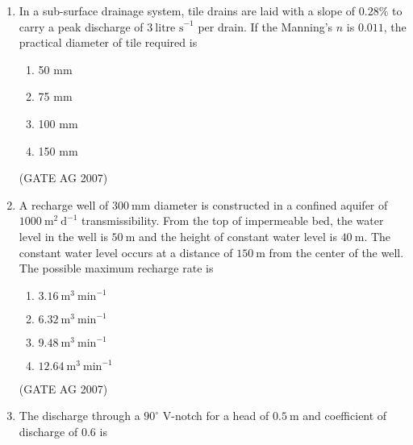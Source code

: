 \documentclass[journal,12pt,onecolumn]{IEEEtran}
\theoremstyle{remark}
\begin{document}
\begin{enumerate}[label=Q\arabic*:]
\begin{multicols}{4}
\begin{enumerate}
\item 21110 m$^3$
\item 32220 m$^3$
\item 42220 m$^3$
\item 59340 m$^3$
\end{enumerate}
\end{multicols}
\hfill(GATE AG 2007)

\item In a sub-surface drainage system, tile drains are laid with a slope of $0.28\%$ to carry a peak discharge of $3\ \text{litre s}^{-1}$ per drain. If the Manning's $n$ is $0.011$, the practical diameter of tile required is

\begin{multicols}{4}
\begin{enumerate}
\item 50 mm
\item 75 mm
\item 100 mm
\item 150 mm
\end{enumerate}
\end{multicols}

\hfill(GATE AG 2007)

\item A recharge well of $300\ \text{mm}$ diameter is constructed in a confined aquifer of $1000\ \text{m}^2\ \text{d}^{-1}$ transmissibility. From the top of impermeable bed, the water level in the well is $50\ \text{m}$ and the height of constant water level is $40\ \text{m}$. The constant water level occurs at a distance of $150\ \text{m}$ from the center of the well. The possible maximum recharge rate is

\begin{multicols}{4}
\begin{enumerate}
\item $3.16\ \text{m}^3\ \text{min}^{-1}$
\item $6.32\ \text{m}^3\ \text{min}^{-1}$
\item $9.48\ \text{m}^3\ \text{min}^{-1}$
\item $12.64\ \text{m}^3\ \text{min}^{-1}$
\end{enumerate}
\end{multicols}
\hfill(GATE AG 2007)


\item The discharge through a $90^\circ$ V-notch for a head of $0.5\ \text{m}$ and coefficient of discharge of $0.6$ is


\end{enumerate}
\end{document}
